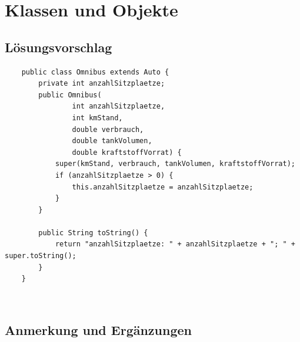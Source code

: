 \chapter{Klassen und Objekte}

\section{Lösungsvorschlag}


\begin{verbatim}
    public class Omnibus extends Auto {
        private int anzahlSitzplaetze;
        public Omnibus(
                int anzahlSitzplaetze,
                int kmStand,
                double verbrauch,
                double tankVolumen,
                double kraftstoffVorrat) {
            super(kmStand, verbrauch, tankVolumen, kraftstoffVorrat);
            if (anzahlSitzplaetze > 0) {
                this.anzahlSitzplaetze = anzahlSitzplaetze;
            }
        }

        public String toString() {
            return "anzahlSitzplaetze: " + anzahlSitzplaetze + "; " + super.toString();
        }
    }
\end{verbatim}\\

\section{Anmerkung und Ergänzungen}

